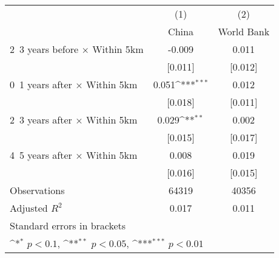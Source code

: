 {
\def\sym#1{\ifmmode^{#1}\else\(^{#1}\)\fi}
\begin{tabular}{l*{2}{c}}
\hline\hline
                    &\multicolumn{1}{c}{(1)}&\multicolumn{1}{c}{(2)}\\
                    &\multicolumn{1}{c}{China}&\multicolumn{1}{c}{World Bank}\\
\hline
2~3 years before × Within 5km&      -0.009         &       0.011         \\
                    &     [0.011]         &     [0.012]         \\
0~1 years after × Within 5km&       0.051\sym{***}&       0.012         \\
                    &     [0.018]         &     [0.011]         \\
2~3 years after × Within 5km&       0.029\sym{**} &       0.002         \\
                    &     [0.015]         &     [0.017]         \\
4~5 years after × Within 5km&       0.008         &       0.019         \\
                    &     [0.016]         &     [0.015]         \\
\hline
Observations        &       64319         &       40356         \\
Adjusted \(R^{2}\)  &       0.017         &       0.011         \\
\hline\hline
\multicolumn{3}{l}{\footnotesize Standard errors in brackets}\\
\multicolumn{3}{l}{\footnotesize \sym{*} \(p<0.1\), \sym{**} \(p<0.05\), \sym{***} \(p<0.01\)}\\
\end{tabular}
}
